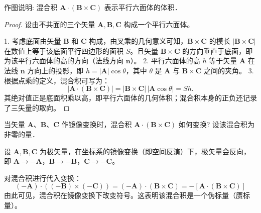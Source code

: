 \begin{exercise}\label{ex:1.15}
作图说明: 混合积 $\boldsymbol{A} \cdot (\boldsymbol{B} \times \boldsymbol{C})$ 表示平行六面体的体积．
\end{exercise}
\begin{proof}
设由不共面的三个矢量 $\boldsymbol{A}, \boldsymbol{B}, \boldsymbol{C}$ 构成一个平行六面体。

1. 考虑底面由矢量 $\boldsymbol{B}$ 和 $\boldsymbol{C}$ 构成，由叉乘的几何意义可知，$\boldsymbol{B} \times \boldsymbol{C}$ 的模长 $|\boldsymbol{B} \times \boldsymbol{C}|$ 在数值上等于该底面平行四边形的面积 $S$。且矢量 $\boldsymbol{B} \times \boldsymbol{C}$ 的方向垂直于底面，即为该平行六面体的高的方向（法线方向 $\boldsymbol{n}$）。
2. 平行六面体的高 $h$ 等于矢量 $\boldsymbol{A}$ 在法线 $\boldsymbol{n}$ 方向上的投影，即 $h = |\boldsymbol{A}| \cos\theta$，其中 $\theta$ 是 $\boldsymbol{A}$ 与 $\boldsymbol{B} \times \boldsymbol{C}$ 之间的夹角。
3. 根据点乘的定义，混合积可写为：
$$ \left|\boldsymbol{A} \cdot (\boldsymbol{B} \times \boldsymbol{C})\right|=|\boldsymbol{B}\times\boldsymbol{C}|\,|\boldsymbol{A}\cos\theta|=Sh. $$
其绝对值正是底面积乘以高，即平行六面体的几何体积；混合积本身的正负还记录了三矢量的取向。
\end{proof}

\begin{exercise}\label{ex:1.16}
当矢量 $\boldsymbol{A}$、$\boldsymbol{B}$、$\boldsymbol{C}$ 作镜像变换时，混合积 $\boldsymbol{A} \cdot (\boldsymbol{B} \times \boldsymbol{C})$ 如何变换? 设该混合积为非零的量．
\end{exercise}
\begin{solution}
设 $\boldsymbol{A}, \boldsymbol{B}, \boldsymbol{C}$ 为极矢量，在坐标系的镜像变换（即空间反演）下，极矢量会反向，即 $\boldsymbol{A} \to -\boldsymbol{A}$，$\boldsymbol{B} \to -\boldsymbol{B}$，$\boldsymbol{C} \to -\boldsymbol{C}$。

对混合积进行代入变换：
$$ (-\boldsymbol{A}) \cdot ((-\boldsymbol{B}) \times (-\boldsymbol{C})) = (-\boldsymbol{A}) \cdot (\boldsymbol{B} \times \boldsymbol{C}) = - \left[ \boldsymbol{A} \cdot (\boldsymbol{B} \times \boldsymbol{C}) \right] $$
由此可见，混合积在镜像变换下改变符号。这表明该混合积是一个伪标量（赝标量）。
\end{solution}

